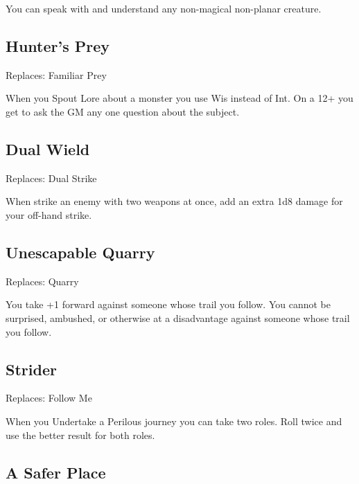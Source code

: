          

You can speak with and understand any non-magical non-planar creature.

         
\subsection{Hunter's Prey}    
         

Replaces: Familiar Prey

         

When you Spout Lore about a monster you use Wis instead of Int. On a 12+ you get to ask the GM any one question about the subject.

         
\subsection{Dual Wield}    
         

Replaces: Dual Strike

         

When strike an enemy with two weapons at once, add an extra 1d8 damage for your off-hand strike.

         
\subsection{Unescapable Quarry}    
         

Replaces: Quarry

         

You take +1 forward against someone whose trail you follow. You cannot be surprised, ambushed, or otherwise at a disadvantage against someone whose trail you follow.

         
\subsection{Strider}   
         

Replaces: Follow Me

         

When you Undertake a Perilous journey you can take two roles. Roll twice and use the better result for both roles.

         
\subsection{A Safer Place}    
         

